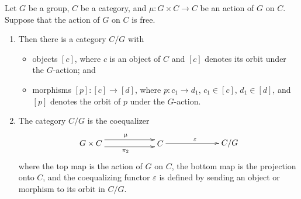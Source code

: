 \begin{lem}\label{lem:coeq-lem}
Let $G$ be a group, $C$ be a category, and $\mu \colon G \times C \to C$ be an action of $G$ on $C$. Suppose that the action of $G$ on $C$ is free.
\begin{enumerate}
\item Then there is a category $C/G$ with
\begin{itemize}
\item objects $[c]$, where $c$ is an object of $C$ and $[c]$ denotes its orbit under the $G$-action; and
\item morphisms $[p] \colon [c] \to [d]$, where $p \colon c_1 \to d_1$, $c_1 \in [c]$, $d_1 \in [d]$, and $[p]$ denotes the orbit of $p$ under the $G$-action.
\end{itemize}
\item The category $C/G$ is the coequalizer
    \[
        \xy
            (0,0)*+{G \times C}="00";
            (30,0)*+{C}="10";
            (60,0)*+{C/G}="20";
            {\ar@<1ex>^{\mu} "00" ; "10"};
            {\ar@<-1ex>_{\pi_2} "00" ; "10"};
            {\ar^{\varepsilon} "10" ; "20"};
        \endxy
    \]
where the top map is the action of $G$ on $C$, the bottom map is the projection onto $C$, and the coequalizing functor $\varepsilon$ is defined by sending an object or morphism to its orbit in $C/G$.
\end{enumerate}

\end{lem}
